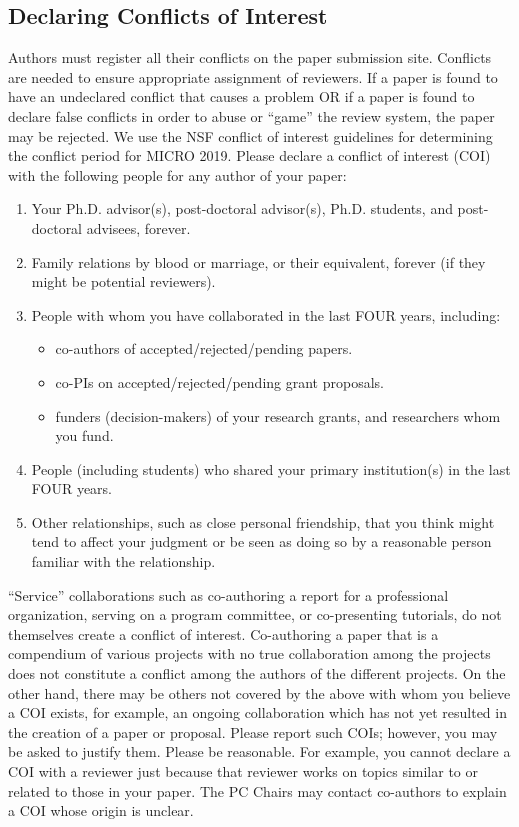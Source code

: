 \documentclass{sig-alternate}
\begin{document}
\subsection{Declaring Conflicts of Interest}
Authors must register all their conflicts on the paper submission site. Conflicts are needed to ensure appropriate assignment of reviewers.  If a paper is found to have an undeclared conflict that causes a problem OR if a paper is found to declare false conflicts in order to abuse or ``game'' the review system, the paper may be rejected. We use the NSF conflict of interest guidelines for determining the conflict period for MICRO 2019.  Please declare a conflict of interest (COI) with the following people for any author of your paper:

\begin{enumerate}
\item Your Ph.D. advisor(s), post-doctoral advisor(s), Ph.D. students,
      and post-doctoral advisees, forever.
\item Family relations by blood or marriage, or their equivalent,
      forever (if they might be potential reviewers).
\item People with whom you have collaborated in the last FOUR years, including:
  \begin{itemize}
  \item co-authors of accepted/rejected/pending papers.
  \item co-PIs on accepted/rejected/pending grant proposals.
  \item funders (decision-makers) of your research grants, and researchers
      whom you fund.
  \end{itemize}
\item People (including students) who shared your primary institution(s) in the
last FOUR years.
\item Other relationships, such as close personal friendship, that you think might tend
to affect your judgment or be seen as doing so by a reasonable person familiar
with the relationship.
\end{enumerate}

``Service'' collaborations such as co-authoring a report for a professional organization, serving on a program committee, or co-presenting  tutorials, do not themselves create a conflict of interest.  Co-authoring a paper that is a compendium of various projects with  no true collaboration among the projects does not constitute a  conflict among the authors of the different projects. On the other hand, there may be others not covered by the above with whom you believe a COI exists, for example, an ongoing collaboration which has not yet resulted in the creation of a paper or proposal. Please report such COIs; however, you may be asked to justify them. Please be reasonable. For example, you cannot declare a COI with a reviewer just because that reviewer works on topics similar to or related to those in your paper.  The PC Chairs may contact co-authors to explain a COI whose origin is unclear.
\end{document}
